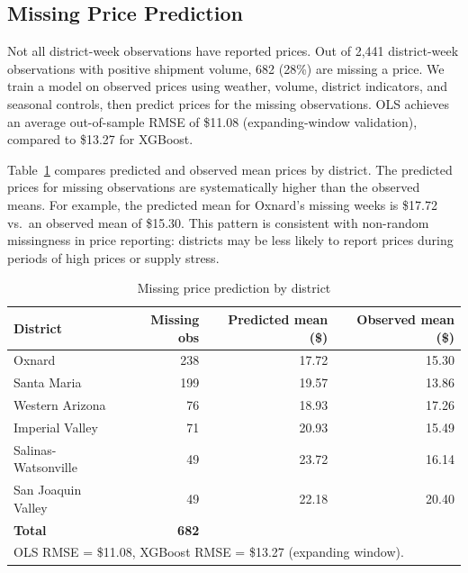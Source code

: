 \documentclass[12pt]{article}
\begin{document}
\subsection{Missing Price Prediction}
\label{subsec:missing_price}

Not all district-week observations have reported prices. Out of 2,441 district-week observations with positive shipment volume, 682 (28\%) are missing a price. We train a model on observed prices using weather, volume, district indicators, and seasonal controls, then predict prices for the missing observations. OLS achieves an average out-of-sample RMSE of \$11.08 (expanding-window validation), compared to \$13.27 for XGBoost.

Table~\ref{tab:missing} compares predicted and observed mean prices by district. The predicted prices for missing observations are systematically higher than the observed means. For example, the predicted mean for Oxnard's missing weeks is \$17.72 vs.\ an observed mean of \$15.30. This pattern is consistent with non-random missingness in price reporting: districts may be less likely to report prices during periods of high prices or supply stress.

\begin{table}[!htbp]
\centering
\caption{Missing price prediction by district}
\label{tab:missing}
\begin{tabular}{lrrr}
\toprule
District & Missing obs & Predicted mean (\$) & Observed mean (\$) \\
\midrule
Oxnard & 238 & 17.72 & 15.30 \\
Santa Maria & 199 & 19.57 & 13.86 \\
Western Arizona & 76 & 18.93 & 17.26 \\
Imperial Valley & 71 & 20.93 & 15.49 \\
Salinas-Watsonville & 49 & 23.72 & 16.14 \\
San Joaquin Valley & 49 & 22.18 & 20.40 \\
\midrule
\textbf{Total} & \textbf{682} & & \\
\bottomrule
\multicolumn{4}{l}{\footnotesize OLS RMSE = \$11.08, XGBoost RMSE = \$13.27 (expanding window).} \\
\end{tabular}
\end{table}

\end{document}
